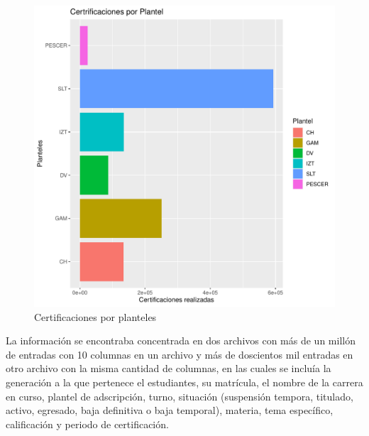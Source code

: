 \documentclass[12pt]{article}
\begin{document}
\begin{figure}
\centering
\includegraphics[scale=0.45]{Graficas/ggplotBarplotPlanteles.pdf}
\caption{Certificaciones por planteles}
\label{Fig.Cert.Plantel}
\end{figure}

La informaci\'on se encontraba concentrada en dos archivos con m\'as de un mill\'on de entradas con 10 columnas en un archivo y m\'as de doscientos mil entradas en otro archivo con la misma cantidad de columnas, en las cuales se inclu\'ia la generaci\'on a la que pertenece el estudiantes, su matr\'icula, el nombre de la carrera en curso,  plantel de adscripci\'on, turno, situaci\'on (suspensi\'on tempora, titulado,   activo,  egresado,  baja definitiva o baja temporal), materia, tema espec\'ifico, calificaci\'on y periodo de certificaci\'on.
\end{document}
